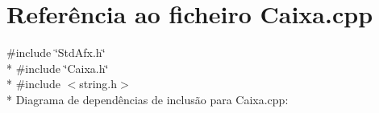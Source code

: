 \hypertarget{a00007}{\section{Referência ao ficheiro Caixa.\+cpp}
\label{a00007}
}
{\ttfamily \#include \char`\"{}Std\+Afx.\+h\char`\"{}}\\*
{\ttfamily \#include \char`\"{}Caixa.\+h\char`\"{}}\\*
{\ttfamily \#include $<$string.\+h$>$}\\*
Diagrama de dependências de inclusão para Caixa.\+cpp\+:

